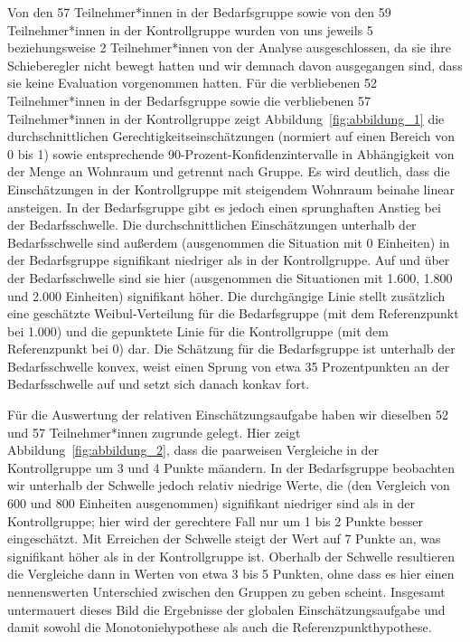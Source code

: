 \documentclass[justified,nobib,symmetric,twoside]{tufte-handout}
\begin{document}
Von den 57 Teilnehmer*innen in der Bedarfsgruppe sowie von den 59 Teilnehmer*innen in der Kontrollgruppe wurden von uns jeweils 5 beziehungsweise 2 Teilnehmer*innen von der Analyse ausgeschlossen, da sie ihre Schieberegler nicht bewegt hatten und wir demnach davon ausgegangen sind, dass sie keine Evaluation vorgenommen hatten.
Für die verbliebenen 52 Teilnehmer*innen in der Bedarfsgruppe sowie die verbliebenen 57 Teilnehmer*innen in der Kontrollgruppe zeigt Abbildung~\ref{fig:abbildung_1} die durchschnittlichen Gerechtigkeitseinschätzungen (normiert auf einen Bereich von 0 bis 1) sowie entsprechende 90-Prozent-Konfidenzintervalle in Abhängigkeit von der Menge an Wohnraum und getrennt nach Gruppe.
Es wird deutlich, dass die Einschätzungen in der Kontrollgruppe mit steigendem Wohnraum beinahe linear ansteigen.
In der Bedarfsgruppe gibt es jedoch einen sprunghaften Anstieg bei der Bedarfsschwelle.
Die durchschnittlichen Einschätzungen unterhalb der Bedarfsschwelle sind außerdem (ausgenommen die Situation mit 0 Einheiten) in der Bedarfsgruppe signifikant niedriger als in der Kontrollgruppe.
Auf und über der Bedarfsschwelle sind sie hier (ausgenommen die Situationen mit 1.600, 1.800 und 2.000 Einheiten) signifikant höher.
Die durchgän\-gige Linie stellt zusätzlich eine geschätzte Weibul-Verteilung für die Bedarfsgruppe (mit dem Referenzpunkt bei 1.000) und die gepunktete Linie für die Kontrollgruppe (mit dem Referenzpunkt bei 0) dar.
Die Schätzung für die Bedarfsgruppe ist unterhalb der Bedarfsschwelle konvex, weist einen Sprung von etwa 35 Prozentpunkten an der Bedarfsschwelle auf und setzt sich danach konkav fort.

Für die Auswertung der relativen Einschätzungsaufgabe haben wir dieselben 52 und 57 Teilnehmer*innen zugrunde gelegt.
Hier zeigt Abbildung~\ref{fig:abbildung_2}, dass die paarweisen Vergleiche in der Kontrollgruppe um 3 und 4 Punkte mäandern.
In der Bedarfsgruppe beobachten wir unterhalb der Schwelle jedoch relativ niedrige Werte, die (den Vergleich von 600 und 800 Einheiten ausgenommen) signifikant niedriger sind als in der Kontrollgruppe; hier wird der gerechtere Fall nur um 1 bis 2 Punkte besser eingeschätzt.
Mit Erreichen der Schwelle steigt der Wert auf 7 Punkte an, was signifikant höher als in der Kontrollgruppe ist.
Oberhalb der Schwelle resultieren die Vergleiche dann in Werten von etwa 3 bis 5 Punkten, ohne dass es hier einen nennenswerten Unterschied zwischen den Gruppen zu geben scheint.
Insgesamt untermauert dieses Bild die Ergebnisse der globalen Einschätzungsaufgabe und damit sowohl die Monotoniehypothese als auch die Referenzpunkthypothese.
\end{document}

